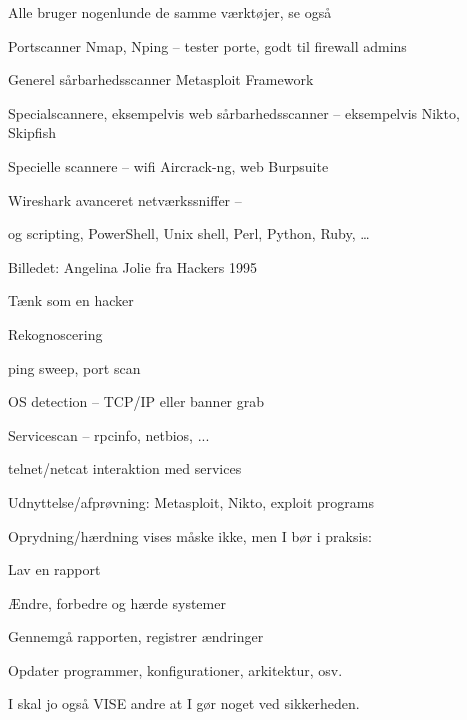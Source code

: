 \documentclass[20pt,landscape,a4paper,footrule]{foils}
\begin{document}

\begin{list2}
\item Alle bruger nogenlunde de samme værktøjer, se også 
\item Portscanner Nmap, Nping -- tester porte, godt til firewall admins 
\item Generel sårbarhedsscanner Metasploit Framework 
\item Specialscannere, eksempelvis web sårbarhedsscanner -- eksempelvis Nikto, Skipfish
\item Specielle scannere -- wifi Aircrack-ng, web Burpsuite 
\item Wireshark avanceret netværkssniffer -- 
\item og scripting, PowerShell, Unix shell, Perl, Python, Ruby, \ldots
\end{list2}

Billedet: Angelina Jolie fra Hackers 1995



\begin{list1}
\item Tænk som en hacker
\item Rekognoscering
\begin{list2}
\item ping sweep, port scan
\item OS detection -- TCP/IP eller banner grab
\item Servicescan -- rpcinfo, netbios, ...
\item telnet/netcat interaktion med services
\end{list2}
\item Udnyttelse/afprøvning: Metasploit, Nikto, exploit programs
\item Oprydning/hærdning vises måske ikke, men I bør i praksis:
\begin{list2}
\item Lav en rapport
\item Ændre, forbedre og hærde systemer
\item Gennemgå rapporten, registrer ændringer
\item Opdater programmer, konfigurationer, arkitektur, osv.
\end{list2}
\item I skal jo også VISE andre at I gør noget ved sikkerheden.
\end{list1}
\end{document}

